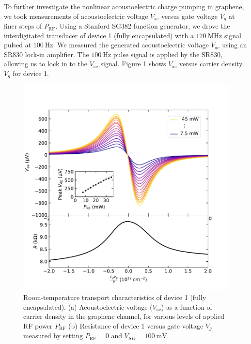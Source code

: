 \documentclass[double,12pt,1in,seploa]{beavtex}
\begin{document}
To further investigate the nonlinear acoustoelectric charge pumping in graphene, we took measurements of acoustoelectric voltage $V_{\mathrm{ae}}$ versus gate voltage $V_g$ at finer steps of $P_{\mathrm{RF}}$. Using a Stanford SG382 function generator, we drove the interdigitated transducer of device 1 (fully encapsulated) with a $\SI{170}{\mega\hertz}$ signal pulsed at $\SI{100}{\hertz}$. We measured the generated acoustoelectric voltage $V_{\mathrm{ae}}$ using an SR830 lock-in amplifier. The $\SI{100}{\hertz}$ pulse signal is applied by the SR830, allowing us to lock in to the $V_{\mathrm{ae}}$ signal. Figure \ref{AEV nonlinear series} shows $V_{\mathrm{ae}}$ versus carrier density $V_g$ for device 1.
\begin{figure}
    \includegraphics{AEV V3 power series plot.pdf}
    \caption{Room-temperature transport characteristics of device 1 (fully encapsulated). (a) Acoustoelectric voltage ($V_{\mathrm{ae}}$) as a function of carrier density in the graphene channel, for various levels of applied RF power $P_{\mathrm{RF}}$ (b) Resistance of device 1 versus gate voltage $V_g$ measured by setting $P_{\mathrm{RF}} = 0$ and $V_{SD} = \SI{100}{\milli\volt}$.}
    \label{AEV nonlinear series}
\end{figure}
\end{document}
